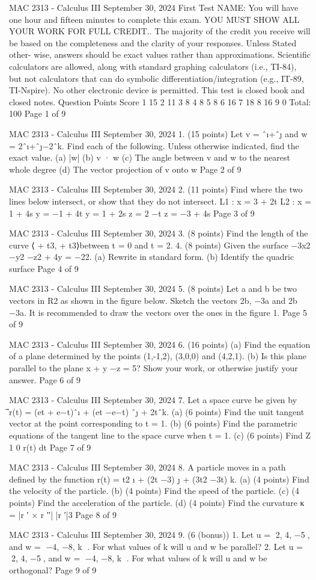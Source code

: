 MAC 2313 - Calculus III
September 30, 2024
First Test
NAME:
You will have one hour and fifteen minutes to complete this exam. YOU MUST SHOW
ALL YOUR WORK FOR FULL CREDIT.. The majority of the credit you receive
will be based on the completeness and the clarity of your responses. Unless Stated other-
wise, answers should be exact values rather than approximations. Scientific calculators are
allowed, along with standard graphing calculators (i.e., TI-84), but not calculators that can
do symbolic differentiation/integration (e.g., IT-89, TI-Nspire). No other electronic device
is permitted. This test is closed book and closed notes.
Question
Points
Score
1
15
2
11
3
8
4
8
5
8
6
16
7
18
8
16
9
0
Total:
100
Page 1 of 9

MAC 2313 - Calculus III
September 30, 2024
1.
(15 points)
Let ⃗v = ˆı+ˆȷ and ⃗w = 2ˆı+ˆȷ−2ˆk. Find each of the following. Unless otherwise indicated,
find the exact value.
(a) |⃗w|
(b) ⃗v · ⃗w
(c) The angle between ⃗v and ⃗w to the nearest whole degree
(d) The vector projection of ⃗v onto ⃗w
Page 2 of 9

MAC 2313 - Calculus III
September 30, 2024
2.
(11 points)
Find where the two lines below intersect, or show that they do not intersect.
L1 :
x = 3 + 2t
L2 :
x = 1 + 4s
y = −1 + 4t
y = 1 + 2s
z = 2 −t
z = −3 + 4s
Page 3 of 9

MAC 2313 - Calculus III
September 30, 2024
3.
(8 points)
Find the length of the curve ⟨
 + t3,
 + t3⟩between t = 0 and t = 2.
4.
(8 points)
Given the surface −3x2 −y2 −z2 + 4y = −22.
(a) Rewrite in standard form.
(b) Identify the quadric surface
Page 4 of 9

MAC 2313 - Calculus III
September 30, 2024
5.
(8 points)
Let ⃗a and ⃗b be two vectors in R2 as shown in the figure below. Sketch the vectors 2⃗b,
−3⃗a and 2⃗b −3⃗a. It is recommended to draw the vectors over the ones in the figure 1.
Page 5 of 9

MAC 2313 - Calculus III
September 30, 2024
6.
(16 points)
(a) Find the equation of a plane determined by the points (1,-1,2), (3,0,0) and (4,2,1).
(b) Is this plane parallel to the plane x + y −z = 5? Show your work, or otherwise
justify your answer.
Page 6 of 9

MAC 2313 - Calculus III
September 30, 2024
7. Let a space curve be given by ⃗r(t) = (et + e−t)ˆı + (et −e−t) ˆȷ + 2tˆk.
(a)
(6 points)
Find the unit tangent vector at the point corresponding to t = 1.
(b)
(6 points)
Find the parametric equations of the tangent line to the space curve when t = 1.
(c)
(6 points)
Find
Z 1
0
⃗r(t) dt
Page 7 of 9

MAC 2313 - Calculus III
September 30, 2024
8. A particle moves in a path defined by the function ⃗r(t) = t2 ⃗ı + (2t −3) ⃗ȷ + (3t2 −3t) ⃗k.
(a)
(4 points)
Find the velocity of the particle.
(b)
(4 points)
Find the speed of the particle.
(c)
(4 points)
Find the acceleration of the particle.
(d)
(4 points)
Find the curvature κ = |⃗r ′ × ⃗r ′′|
|⃗r ′|3
Page 8 of 9

MAC 2313 - Calculus III
September 30, 2024
9.
(6 (bonus))
1. Let ⃗u = ⟨2, 4, −5⟩, and ⃗w = ⟨−4, −8, k ⟩. For what values of k will ⃗u and ⃗w be
parallel?
2. Let ⃗u = ⟨2, 4, −5⟩, and ⃗w = ⟨−4, −8, k ⟩. For what values of k will ⃗u and ⃗w be
orthogonal?
Page 9 of 9

